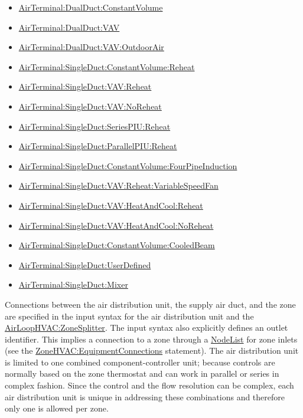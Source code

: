 \begin{itemize}
\item
  \hyperref[airterminaldualductconstantvolume]{AirTerminal:DualDuct:ConstantVolume}
\item
  \hyperref[airterminaldualductvav]{AirTerminal:DualDuct:VAV}
\item
  \hyperref[airterminaldualductvavoutdoorair]{AirTerminal:DualDuct:VAV:OutdoorAir}
\item
  \hyperref[airterminalsingleductconstantvolumereheat]{AirTerminal:SingleDuct:ConstantVolume:Reheat}
\item
  \hyperref[airterminalsingleductvavreheat]{AirTerminal:SingleDuct:VAV:Reheat}
\item
  \hyperref[airterminalsingleductvavnoreheat]{AirTerminal:SingleDuct:VAV:NoReheat}
\item
  \hyperref[airterminalsingleductseriespiureheat]{AirTerminal:SingleDuct:SeriesPIU:Reheat}
\item
  \hyperref[airterminalsingleductparallelpiureheat]{AirTerminal:SingleDuct:ParallelPIU:Reheat}
\item
  \hyperref[airterminalsingleductconstantvolumefourpipeinduction]{AirTerminal:SingleDuct:ConstantVolume:FourPipeInduction}
\item
  \hyperref[airterminalsingleductvavreheatvariablespeedfan]{AirTerminal:SingleDuct:VAV:Reheat:VariableSpeedFan}
\item
  \hyperref[airterminalsingleductvavheatandcoolreheat]{AirTerminal:SingleDuct:VAV:HeatAndCool:Reheat}
\item
  \hyperref[airterminalsingleductvavheatandcoolnoreheat]{AirTerminal:SingleDuct:VAV:HeatAndCool:NoReheat}
\item
  \hyperref[airterminalsingleductconstantvolumecooledbeam]{AirTerminal:SingleDuct:ConstantVolume:CooledBeam}
\item
  \hyperref[airterminalsingleductuserdefined]{AirTerminal:SingleDuct:UserDefined}
\item
  \hyperref[airterminalsingleductmixer]{AirTerminal:SingleDuct:Mixer}

\end{itemize}

Connections between the air distribution unit, the supply air duct, and the zone are specified in the input syntax for the air distribution unit and the \hyperref[airloophvaczonesplitter]{AirLoopHVAC:ZoneSplitter}. The input syntax also explicitly defines an outlet identifier. This implies a connection to a zone through a \hyperref[nodelist]{NodeList} for zone inlets (see the \hyperref[zonehvacequipmentconnections]{ZoneHVAC:EquipmentConnections} statement). The air distribution unit is limited to one combined component-controller unit; because controls are normally based on the zone thermostat and can work in parallel or series in complex fashion. Since the control and the flow resolution can be complex, each air distribution unit is unique in addressing these combinations and therefore only one is allowed per zone.

